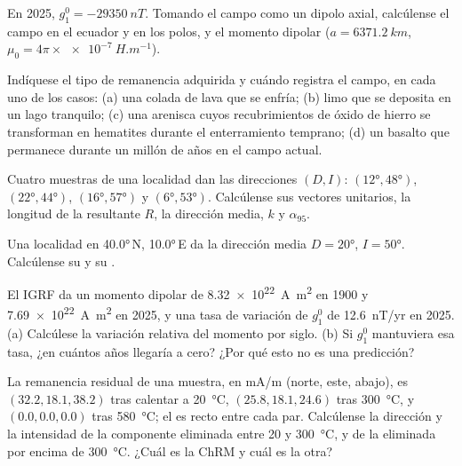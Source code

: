 \begin{exercise}[$\star$]\label{exo:b3:palaeomagnetism:3}
En 2025, $g_1^0 = \qty{-29350}{nT}$. Tomando el campo como un dipolo axial,
calcúlense el campo en el ecuador y en los polos, y el momento dipolar
($a = \qty{6371.2}{km}$, $\mu_0 = 4\pi\times\qty{e-7}{H.m^{-1}}$).
\end{exercise}

\begin{exercise}[$\star$]\label{exo:b3:palaeomagnetism:4}
Indíquese el tipo de remanencia adquirida y cuándo registra el campo, en cada uno de los casos: (a) una colada de lava que se enfría;
(b) limo que se deposita en un lago tranquilo; (c) una arenisca cuyos recubrimientos de óxido de hierro
se transforman en hematites durante el enterramiento temprano; (d) un basalto que permanece
durante un millón de años en el campo actual.
\end{exercise}

\begin{exercise}[$\star\star$]\label{exo:b3:palaeomagnetism:5}
Cuatro muestras de una localidad dan las direcciones $(D, I)$: $(\ang{12}, \ang{48})$,
$(\ang{22}, \ang{44})$, $(\ang{16}, \ang{57})$ y $(\ang{6}, \ang{53})$.
Calcúlense sus vectores unitarios, la longitud de la resultante $R$, la dirección media, $k$
y $\alpha_{95}$.
\end{exercise}

\begin{exercise}[$\star\star$]\label{exo:b3:palaeomagnetism:6}
Una localidad en \ang{40.0}\,N, \ang{10.0}\,E da la dirección media $D = \ang{20}$,
$I = \ang{50}$. Calcúlense su  y su .
\end{exercise}

\begin{exercise}[$\star\star$]\label{exo:b3:palaeomagnetism:7}
El IGRF da un momento dipolar de \qty{8.32e22}{A.m^2} en 1900 y
\qty{7.69e22}{A.m^2} en 2025, y una tasa de variación de $g_1^0$ de
\qty{+12.6}{nT/yr} en 2025. (a) Calcúlese la variación relativa del momento por
siglo. (b) Si $g_1^0$ mantuviera esa tasa, ¿en cuántos años llegaría a cero?
¿Por qué esto no es una predicción?
\end{exercise}

\begin{exercise}[$\star\star$]\label{exo:b3:palaeomagnetism:8}
La remanencia residual de una muestra, en \unit{mA/m} (norte, este, abajo), es
$(32.2, 18.1, 38.2)$ tras calentar a \qty{20}{\celsius}, $(25.8, 18.1, 24.6)$
tras \qty{300}{\celsius}, y $(0.0, 0.0, 0.0)$ tras \qty{580}{\celsius}; el
 es recto entre cada par. Calcúlense la dirección y la
intensidad de la componente eliminada entre 20 y \qty{300}{\celsius}, y de la
eliminada por encima de \qty{300}{\celsius}. ¿Cuál es la ChRM y cuál es la
otra?
\end{exercise}

